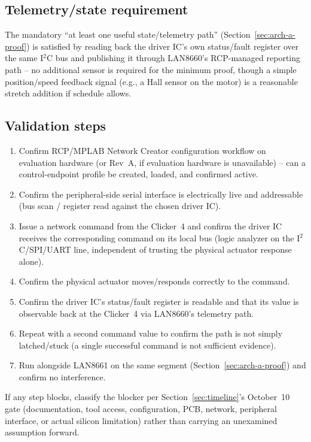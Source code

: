 \subsection{Telemetry/state requirement}

The mandatory ``at least one useful state/telemetry path'' (Section~\ref{sec:arch-a-proof}) is satisfied by reading back the driver IC's own status/fault register over the same I$^2$C bus and publishing it through LAN8660's RCP-managed reporting path -- no additional sensor is required for the minimum proof, though a simple position/speed feedback signal (e.g., a Hall sensor on the motor) is a reasonable stretch addition if schedule allows.

\subsection{Validation steps}

\begin{enumerate}[itemsep=0.1em]
\item Confirm RCP/MPLAB Network Creator configuration workflow on evaluation hardware (or Rev~A, if evaluation hardware is unavailable) -- can a control-endpoint profile be created, loaded, and confirmed active.
\item Confirm the peripheral-side serial interface is electrically live and addressable (bus scan / register read against the chosen driver IC).
\item Issue a network command from the Clicker~4 and confirm the driver IC receives the corresponding command on its local bus (logic analyzer on the I$^2$C/SPI/UART line, independent of trusting the physical actuator response alone).
\item Confirm the physical actuator moves/responds correctly to the command.
\item Confirm the driver IC's status/fault register is readable and that its value is observable back at the Clicker~4 via LAN8660's telemetry path.
\item Repeat with a second command value to confirm the path is not simply latched/stuck (a single successful command is not sufficient evidence).
\item Run alongside LAN8661 on the same segment (Section~\ref{sec:arch-a-proof}) and confirm no interference.
\end{enumerate}

If any step blocks, classify the blocker per Section~\ref{sec:timeline}'s October~10 gate (documentation, tool access, configuration, PCB, network, peripheral interface, or actual silicon limitation) rather than carrying an unexamined assumption forward.
